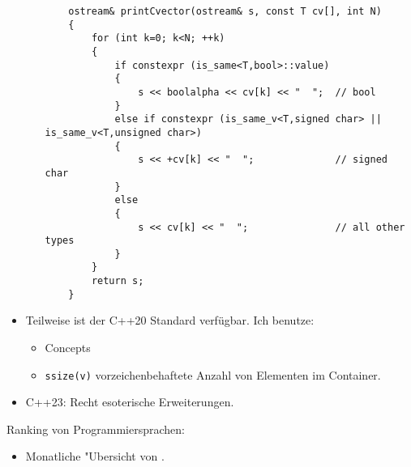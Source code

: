 \begin{itemize}
\begin{itemize}
{\begin{verbatim}
    ostream& printCvector(ostream& s, const T cv[], int N)
    {
        for (int k=0; k<N; ++k)
        {
            if constexpr (is_same<T,bool>::value)
            {
                s << boolalpha << cv[k] << "  ";  // bool
            }
            else if constexpr (is_same_v<T,signed char> || is_same_v<T,unsigned char>)
            {
                s << +cv[k] << "  ";              // signed char
            }
            else
            {
                s << cv[k] << "  ";               // all other types
            }
        }
        return s;
    }
  \end{verbatim} 
  }
  \end{itemize}
  \item Teilweise ist der C++20 Standard verfügbar. Ich benutze:
  \begin{itemize}
    \item Concepts
    \item \verb|ssize(v)| vorzeichenbehaftete Anzahl von Elementen im Container.
  \end{itemize}
  \item C++23: Recht esoterische Erweiterungen.
\end{itemize}

Ranking von Programmiersprachen:
\begin{itemize}
  \item Monatliche "Ubersicht von
         .
\end{itemize}












